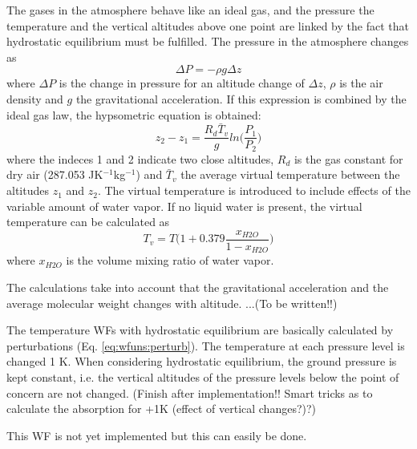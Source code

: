  
 The gases in the atmosphere behave like an ideal gas, and the pressure
 the temperature and the vertical altitudes above one point are
 linked by the fact that hydrostatic equilibrium must be fulfilled. The
 pressure in the atmosphere changes as
 \begin{equation}
   \Delta P = -\rho g \Delta z
 \end{equation}
 where $\Delta P$ is the change in pressure for an altitude change of
 $\Delta z$, $\rho$ is the air density and $g$ the gravitational 
 acceleration. If this expression is combined by the ideal gas law, the
 hypsometric equation is obtained:
 \begin{equation}
   z_2 - z_1 = \frac{R_d\bar{T}_v}{g}ln\Big( \frac{P_1}{P_2} \Big)
 \end{equation}
 where the indeces 1 and 2 indicate two close altitudes, $R_d$ is the
 gas constant for dry air (287.053 JK$^{-1}$kg$^{-1}$) and $\bar{T}_v$
 the average virtual temperature between the altitudes $z_1$ and
 $z_2$.  The virtual temperature is introduced to include effects of
 the variable amount of water vapor. If no liquid water is present, the
 virtual temperature can be calculated as
 \begin{equation}
   T_v = T \Big( 1+0.379\frac{x_{H2O}}{1-x_{H2O}}  \Big)
 \end{equation}
 where $x_{H2O}$ is the volume mixing ratio of water vapor. 

 The calculations take into account that the gravitational acceleration
 and the average molecular weight changes with altitude. ...(To be written!!)
 
 The temperature WFs with hydrostatic equilibrium are basically
 calculated by perturbations (Eq. \ref{eq:wfuns:perturb}). The
 temperature at each pressure level is changed 1 K.  When considering
 hydrostatic equilibrium, the ground pressure is kept constant, i.e.
 the vertical altitudes of the pressure levels below the point of
 concern are not changed. (Finish after implementation!! Smart tricks 
 as to calculate the absorption for +1K (effect of vertical changes?)?)



 \label{sec:wfuns:eground}
 
 This WF is not yet implemented but this can easily be done.


